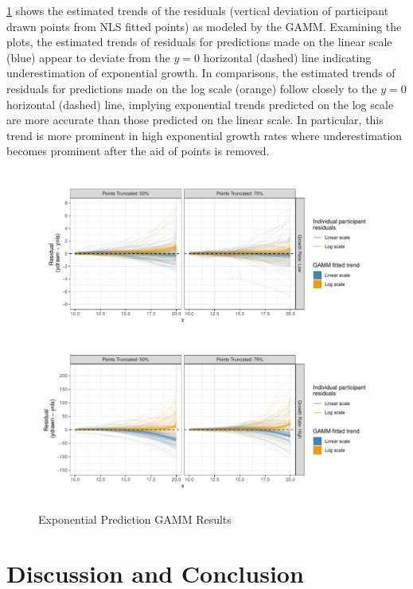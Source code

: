 \documentclass[print]{nuthesis}
\begin{document}
\cref{fig:exponential-prediction-gamm-preds} shows the estimated trends of the residuals (vertical deviation of participant drawn points from NLS fitted points) as modeled by the GAMM.
Examining the plots, the estimated trends of residuals for predictions made on the linear scale (blue) appear to deviate from the \(y=0\) horizontal (dashed) line indicating underestimation of exponential growth.
In comparisons, the estimated trends of residuals for predictions made on the log scale (orange) follow closely to the \(y=0\) horizontal (dashed) line, implying exponential trends predicted on the log scale are more accurate than those predicted on the linear scale.
In particular, this trend is more prominent in high exponential growth rates where underestimation becomes prominent after the aid of points is removed.

\begin{figure}[tbp]

{\centering \includegraphics[width=0.9\linewidth,]{thesis_files/figure-latex/exponential-prediction-gamm-preds-1} 

}

\caption{Exponential Prediction GAMM Results}\label{fig:exponential-prediction-gamm-preds}
\end{figure}

\hypertarget{discussion-and-conclusion-1}{%
\section{Discussion and Conclusion}\label{discussion-and-conclusion-1}}
\end{document}
